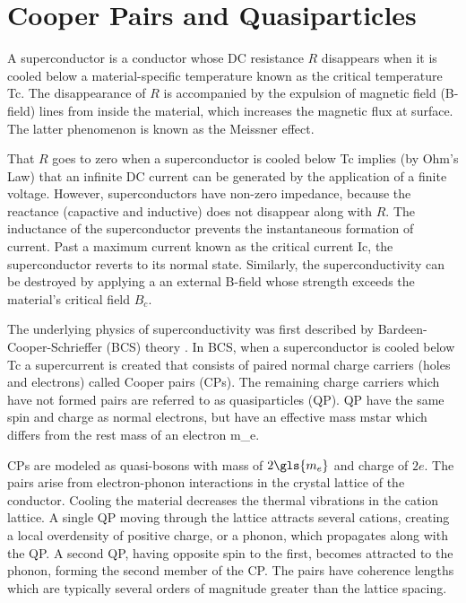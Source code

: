 \section{Cooper Pairs and Quasiparticles}\label{sec:supercond}

A superconductor is a conductor whose DC resistance $R$ disappears when it is cooled below a material-specific temperature known as the critical temperature \gls{Tc}. The disappearance of $R$ is accompanied by the expulsion of magnetic field (B-field) lines from inside the material, which increases the magnetic flux at surface. The latter phenomenon is known as the Meissner effect.

That $R$ goes to zero when a superconductor is cooled below \gls{Tc} implies (by Ohm's Law) that an infinite DC current can be generated by the application of a finite voltage. However, superconductors have non-zero impedance, because the reactance (capactive and inductive) does not disappear along with $R$. The inductance of the superconductor prevents the instantaneous formation of current. Past a maximum current known as the critical current \gls{Ic}, the superconductor reverts to its normal state. Similarly, the superconductivity can be destroyed by applying a an external B-field whose strength exceeds the material's critical field $B_{c}$.

The underlying physics of superconductivity was first described by Bardeen-Cooper-Schrieffer (BCS) theory \citep{bardeen1957theory}. In BCS, when a superconductor is cooled below \gls{Tc} a supercurrent is created that consists of paired normal charge carriers (holes and electrons) called Cooper pairs (CPs). The remaining charge carriers which have not formed pairs are referred to as quasiparticles (QP). QP have the same spin and charge as normal electrons, but have an effective mass \gls{mstar} which differs from the rest mass of an electron \gls{m_e}.

CPs are modeled as quasi-bosons with mass of $2\gls{m_e}$ and charge of $2e$. The pairs arise from electron-phonon interactions in the crystal lattice of the conductor. Cooling the material decreases the thermal vibrations in the cation lattice. A single QP moving through the lattice attracts several cations, creating a local overdensity of positive charge, or a phonon, which propagates along with the QP. A second QP, having opposite spin to the first, becomes attracted to the phonon, forming the second member of the CP. The pairs have coherence lengths which are typically several orders of magnitude greater than the lattice spacing.

